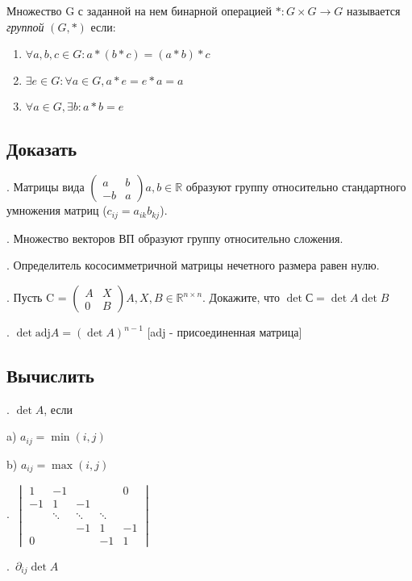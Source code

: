 \documentclass{article}
\begin{document}
Множество G с заданной на нем бинарной операцией $*: G \times G \to G$ называется \textit{группой} $(G, *)$ если:
\begin{enumerate}
    \item $\forall a,b,c \in G: a*(b*c) = (a*b)*c $
    \item $\exists e \in G: \forall a \in G, a*e=e*a=a$
    \item $\forall a \in G, \exists b: a*b = e$
\end{enumerate}


\subsection*{Доказать}

. Матрицы вида  $\left(\begin{matrix}a & b\\ -b & a\end{matrix}\right) a,b \in \mathbb{R}$ образуют группу относительно стандартного умножения матриц ($c_{ij} = a_{ik} b_{kj}$).

. Множество векторов ВП образуют группу относительно сложения.

. Определитель кососимметричной матрицы нечетного размера равен нулю.

. Пусть C = $\left(\begin{matrix}A & X\\ 0 & B\end{matrix}\right) A,X, B \in \mathbb{R}^{n \times n}$. Докажите, что $\det С = \det A \det B$

. $\det \text{adj} A = (\det A)^{n-1}$ [adj - присоединенная матрица]
\subsection*{Вычислить}

. $\det A$, если

 a) $a_{ij} = \min(i,j)$
 
 b) $a_{ij} = \max(i,j)$ 
 
.\ $ \begin{vmatrix}
    1 & -1 &    &    & 0   \\
    -1  & 1       & -1   &      &    \\
      &       \ddots &           \ddots&     \ddots      &    \\
      &         &           -1&          1 & -1\\
        0  &         &           &          -1 & 1
  \end{vmatrix}
  $
  
.\ $\partial_{ij} \det A$
\end{document}
